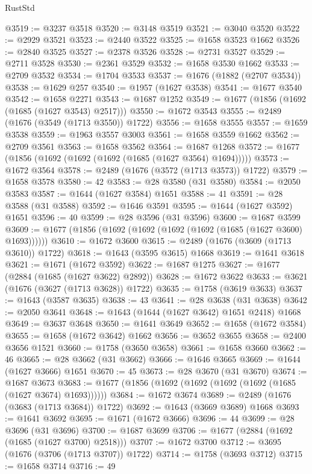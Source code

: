 \begin{lexlean}{RustStd}
\begin{coremodule}
@3519 := @3237 @3518
@3520 := @3148 @3519
@3521 := @3040 @3520
@3522 := @2929 @3521
@3523 := @2440 @3522
@3525 := @1658 @3523 @1662
@3526 := @2840 @3525
@3527 := @2378 @3526
@3528 := @2731 @3527
@3529 := @2711 @3528
@3530 := @2361 @3529
@3532 := @1658 @3530 @1662
@3533 := @2709 @3532
@3534 := @1704 @3533
@3537 := @1676 (@1882 (@2707 @3534))
@3538 := @1629 @257
@3540 := @1957 (@1627 @3538)
@3541 := @1677 @3540
@3542 := @1658 @2271
@3543 := @1687 @1252
@3549 := @1677 (@1856 (@1692 (@1685 (@1627 @3543) @2517)))
@3550 := @1672 @3543
@3555 := @2489 (@1676 (@3549 (@1713 @3550)) @1722)
@3556 := @1658 @3555
@3557 := @1659 @3538
@3559 := @1963 @3557 @3003
@3561 := @1658 @3559 @1662
@3562 := @2709 @3561
@3563 := @1658 @3562
@3564 := @1687 @1268
@3572 := @1677 (@1856 (@1692 (@1692 (@1692 (@1685 (@1627 @3564) @1694)))))
@3573 := @1672 @3564
@3578 := @2489 (@1676 (@3572 (@1713 @3573)) @1722)
@3579 := @1658 @3578
@3580 := 42
@3583 := @28 @3580 (@31 @3580)
@3584 := @2050 @3583
@3587 := @1644 (@1627 @3584) @1651
@3588 := 41
@3591 := @28 @3588 (@31 @3588)
@3592 := @1646 @3591
@3595 := @1644 (@1627 @3592) @1651
@3596 := 40
@3599 := @28 @3596 (@31 @3596)
@3600 := @1687 @3599
@3609 := @1677 (@1856 (@1692 (@1692 (@1692 (@1692 (@1685 (@1627 @3600) @1693))))))
@3610 := @1672 @3600
@3615 := @2489 (@1676 (@3609 (@1713 @3610)) @1722)
@3618 := @1643 (@3595 @3615) @1668
@3619 := @1641 @3618
@3621 := @1671 (@1672 @3592)
@3622 := @1687 @1275
@3627 := @1677 (@2884 (@1685 (@1627 @3622) @2892))
@3628 := @1672 @3622
@3633 := @3621 (@1676 (@3627 (@1713 @3628)) @1722)
@3635 := @1758 (@3619 @3633)
@3637 := @1643 (@3587 @3635)
@3638 := 43
@3641 := @28 @3638 (@31 @3638)
@3642 := @2050 @3641
@3648 := @1643 (@1644 (@1627 @3642) @1651 @2418) @1668
@3649 := @3637 @3648
@3650 := @1641 @3649
@3652 := @1658 (@1672 @3584)
@3655 := @1658 (@1672 @3642) @1662
@3656 := @3652 @3655
@3658 := @2400 @3656 @1521
@3660 := @1758 (@3650 @3658)
@3661 := @1658 @3660
@3662 := 46
@3665 := @28 @3662 (@31 @3662)
@3666 := @1646 @3665
@3669 := @1644 (@1627 @3666) @1651
@3670 := 45
@3673 := @28 @3670 (@31 @3670)
@3674 := @1687 @3673
@3683 := @1677 (@1856 (@1692 (@1692 (@1692 (@1692 (@1685 (@1627 @3674) @1693))))))
@3684 := @1672 @3674
@3689 := @2489 (@1676 (@3683 (@1713 @3684)) @1722)
@3692 := @1643 (@3669 @3689) @1668
@3693 := @1641 @3692
@3695 := @1671 (@1672 @3666)
@3696 := 44
@3699 := @28 @3696 (@31 @3696)
@3700 := @1687 @3699
@3706 := @1677 (@2884 (@1692 (@1685 (@1627 @3700) @2518)))
@3707 := @1672 @3700
@3712 := @3695 (@1676 (@3706 (@1713 @3707)) @1722)
@3714 := @1758 (@3693 @3712)
@3715 := @1658 @3714
@3716 := 49

\end{coremodule}
\end{lexlean}

